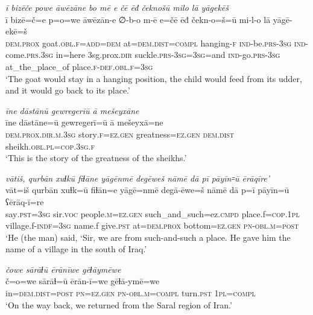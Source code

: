 \ea \label{ZB.54}
\textit{ī bizēče powe āwēzāne bo mē e čē ēđ čeknošū milo lā yāgekēš} \\ 
\gll ī bizē=č=e p=o=we āwēzān-e ∅-b-o m-ē e=čē ēđ čekn-o=š=ū mi-l-o lā yāgē-ekē=š \\ 
 \textsc{dem.prox} goat\textsc{.obl}\textsc{.f}\textsc{=add}\textsc{=dem} at=\textsc{dem.dist}\textsc{=compl} hanging\textsc{-f} \textsc{ind-}be\textsc{.prs}\textsc{-3sg} \textsc{ind-}come\textsc{.prs}\textsc{.3sg} in=here 3sg.prox\textsc{.dir} suckle\textsc{.prs}\textsc{-3sg}\textsc{=3sg}=and \textsc{ind-}go\textsc{.prs}\textsc{-3sg} at\_the\_place\_of place\textsc{.f}\textsc{-def}\textsc{.obl}\textsc{.f}\textsc{=3sg} \\ 
\glt `The goat would stay in a hanging position, the child would feed from its udder, and it would go back to its place.'
\z 
 
\ea \label{ZB.58}
\textit{īne dāstānū gewregerīū ā mešeyxāne} \\ 
\gll īne dāstāne=ū gewregerī=ū ā mešeyxā=ne \\ 
 \textsc{dem.prox}\textsc{.dir}\textsc{.m}\textsc{.3sg} story\textsc{.f}\textsc{\textsc{=ez.gen}} greatness\textsc{\textsc{=ez.gen}} \textsc{dem.dist} sheikh\textsc{.obl}\textsc{.pl}\textsc{=cop}\textsc{.3sg}\textsc{.f} \\ 
\glt `This is the story of the greatness of the sheikhs.'
\z 
 
\ea \label{ZQ.5}
\textit{vātiš, qurbān xuɫkū fiɫāne yāgēnmē degēweš nāmē dā pī pāyīn꞊ū ērāqīre'} \\ 
\gll vāt=iš qurbān xuɫk=ū fiɫān=e yāgē=nmē degā-ēwe=š nāmē dā p=ī pāyīn=ū ʕērāq-ī=re \\ 
 say\textsc{.pst}\textsc{=3sg} sir.\textsc{voc} people\textsc{.m}\textsc{=ez.gen} such\_and\_such=ez\textsc{.cmpd} place.f\textsc{=cop}\textsc{.\textsc{1pl}} village.f\textsc{-indf}\textsc{=3sg} name.f give\textsc{.pst} at=\textsc{dem.prox} bottom\textsc{=ez.gen} \textsc{pn}\textsc{-obl}\textsc{.m}\textsc{=\textsc{post}} \\ 
\glt `He (the man) said, ‘Sir, we are from such-and-such a place. He gave him the name of a village in the south of Iraq.'
\z 
 
\ea \label{ZQ.10}
\textit{čowe sārāɫū ērānīwe gēɫāymēwe} \\ 
\gll č=o=we sārāɫ=ū ērān-ī=we gēɫā-ymē=we \\ 
 in=\textsc{dem.dist}\textsc{=\textsc{post}} \textsc{pn}\textsc{=ez.gen} \textsc{pn}\textsc{-obl}\textsc{.m}\textsc{=compl} turn\textsc{.pst} \textsc{1pl}\textsc{=compl} \\ 
\glt `On the way back, we returned from the Saral region of Iran.'
\z 
 
